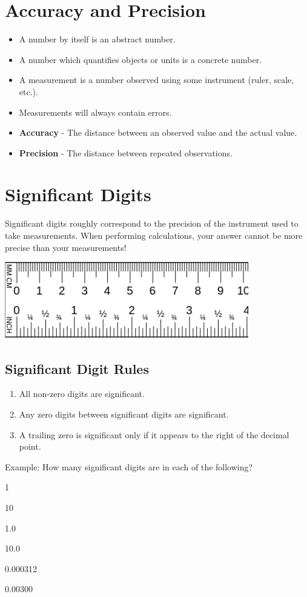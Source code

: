 \documentclass{article}
\begin{document}
\section{Accuracy and Precision}
\begin{itemize}
    \item A number by itself is an abstract number.
    \item A number which quantifies objects or units is a concrete number.
    \item A measurement is a number observed using some instrument (ruler, scale, etc.).
    \item Measurements will always contain errors.
    \item {\bf Accuracy} - The distance between an observed value and the actual value.
    \item {\bf Precision} - The distance between repeated observations.
\end{itemize}

\section{Significant Digits}
Significant digits roughly correspond to the precision of the instrument used to take measurements. When performing calculations, your answer cannot be more precise than your measurements!

\includegraphics[width=4.1875in]{images/ruler-4-1875in}

\subsection{Significant Digit Rules}
\begin{enumerate}
    \item All non-zero digits are significant.
    \item Any zero digits between significant digits are significant.
    \item A trailing zero is significant only if it appears to the right of the decimal point.
\end{enumerate}
Example: How many significant digits are in each of the following?\newline
\begin{enumerate*}[label=\ \ (\alph*)]
    \item 1
    \item 10
    \item 1.0
    \item 10.0
    \item 0.000312
    \item 0.00300
\end{enumerate*}
\end{document}
